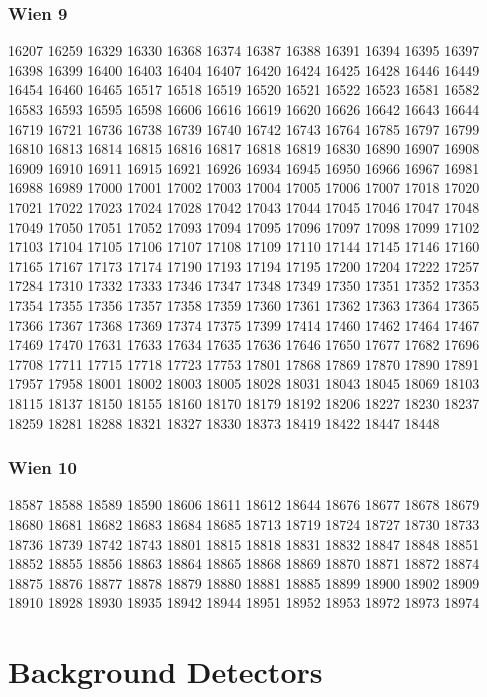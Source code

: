 \subsubsection{Wien 9}
\label{Wien 9}
16207
16259
16329
16330
16368
16374
16387
16388
16391
16394
16395
16397
16398
16399
16400
16403
16404
16407
16420
16424
16425
16428
16446
16449
16454
16460
16465
16517
16518
16519
16520
16521
16522
16523
16581
16582
16583
16593
16595
16598
16606
16616
16619
16620
16626
16642
16643
16644
16719
16721
16736
16738
16739
16740
16742
16743
16764
16785
16797
16799
16810
16813
16814
16815
16816
16817
16818
16819
16830
16890
16907
16908
16909
16910
16911
16915
16921
16926
16934
16945
16950
16966
16967
16981
16988
16989
17000
17001
17002
17003
17004
17005
17006
17007
17018
17020
17021
17022
17023
17024
17028
17042
17043
17044
17045
17046
17047
17048
17049
17050
17051
17052
17093
17094
17095
17096
17097
17098
17099
17102
17103
17104
17105
17106
17107
17108
17109
17110
17144
17145
17146
17160
17165
17167
17173
17174
17190
17193
17194
17195
17200
17204
17222
17257
17284
17310
17332
17333
17346
17347
17348
17349
17350
17351
17352
17353
17354
17355
17356
17357
17358
17359
17360
17361
17362
17363
17364
17365
17366
17367
17368
17369
17374
17375
17399
17414
17460
17462
17464
17467
17469
17470
17631
17633
17634
17635
17636
17646
17650
17677
17682
17696
17708
17711
17715
17718
17723
17753
17801
17868
17869
17870
17890
17891
17957
17958
18001
18002
18003
18005
18028
18031
18043
18045
18069
18103
18115
18137
18150
18155
18160
18170
18179
18192
18206
18227
18230
18237
18259
18281
18288
18321
18327
18330
18373
18419
18422
18447
18448

\subsubsection{Wien 10}
\label{Wien 10}
18587
18588
18589
18590
18606
18611
18612
18644
18676
18677
18678
18679
18680
18681
18682
18683
18684
18685
18713
18719
18724
18727
18730
18733
18736
18739
18742
18743
18801
18815
18818
18831
18832
18847
18848
18851
18852
18855
18856
18863
18864
18865
18868
18869
18870
18871
18872
18874
18875
18876
18877
18878
18879
18880
18881
18885
18899
18900
18902
18909
18910
18928
18930
18935
18942
18944
18951
18952
18953
18972
18973
18974


\section{Background Detectors}
\label{Background Detectors}

